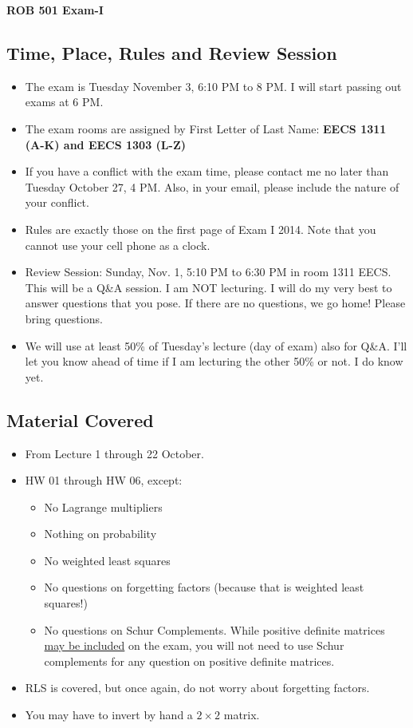 \documentclass[letterpaper]{article}
\begin{document}
\vspace*{.1in}
\begin{center}
\LARGE \bf
ROB 501 Exam-I \\
\end{center}

\vspace*{1cm}

\subsection*{Time, Place, Rules and Review Session}

\begin{itemize}
\item The exam is Tuesday November 3, 6:10 PM to 8 PM. I will start passing out exams at 6 PM.
\item The exam rooms are assigned by First Letter of Last Name: \textbf{EECS 1311 (A-K) and EECS 1303 (L-Z)}
\item If you have a conflict with the exam time, please contact me no later than Tuesday October 27, 4 PM. Also, in your email, please include the nature of your conflict.
\item Rules are exactly those on the first page of Exam I 2014. Note that you cannot use your cell phone as a clock.
\item Review Session:  Sunday, Nov. 1, 5:10 PM to 6:30 PM in room 1311 EECS. This will be a Q\&A session. I am NOT lecturing. I will do my very best to answer questions that you pose. If there are no questions, we go home! Please bring questions.
    \item We will use at least 50\% of Tuesday's lecture (day of exam) also for Q\&A. I'll let you know ahead of time if I am lecturing the other 50\% or not. I do know yet.
\end{itemize}

\subsection*{Material Covered}

\begin{itemize}
\item From Lecture 1 through 22 October.
\item HW 01 through HW 06, except:
\begin{itemize}
\item No Lagrange multipliers
\item Nothing on probability
\item No weighted least squares
\item No questions on forgetting factors (because that is weighted least squares!)
\item No questions on Schur Complements. While positive definite matrices \underline{may be included} on the exam, you will not need to use Schur complements for any question on positive definite matrices.
\end{itemize}
\item RLS is covered, but once again, do not worry about forgetting factors.
\item You may have to invert by hand a $2 \times 2$ matrix.
\end{itemize}
\end{document}
